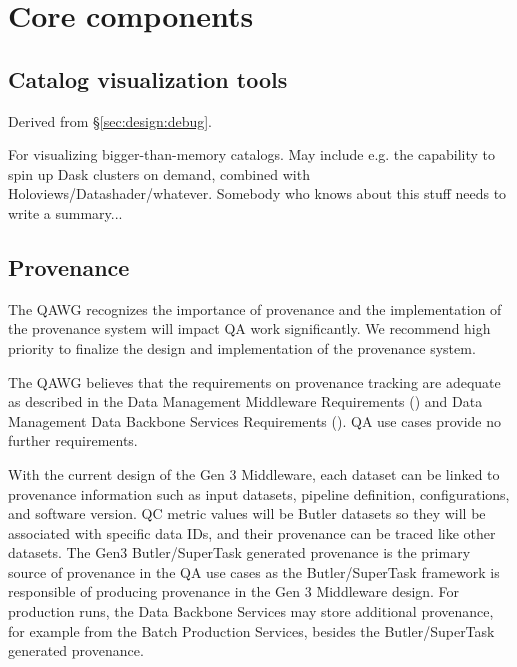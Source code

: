 \section{Core components}







\subsection{Catalog visualization tools}


Derived from \S\ref{sec:design:debug}.

For visualizing bigger-than-memory catalogs. May include e.g. the capability
to spin up Dask clusters on demand, combined with
Holoviews/Datashader/whatever. Somebody who knows about this stuff needs to
write a summary...

\subsection{Provenance}


The QAWG recognizes the importance of provenance and the
implementation of the provenance system will impact QA work
significantly.  We recommend high priority to finalize the design
and implementation of the provenance system.

The QAWG believes that the requirements on provenance tracking are
adequate as described in the Data Management Middleware Requirements
() and Data Management Data Backbone Services
Requirements (). QA use cases provide no further
requirements.

With the current design of the Gen 3 Middleware, each dataset
can be linked to provenance information such as input datasets,
pipeline definition, configurations, and software version.
QC metric values will be Butler datasets so they will be associated
with specific data IDs, and their provenance can be traced like
other datasets.  The Gen3 Butler/SuperTask generated provenance is
the primary source of provenance in the QA use cases as the
Butler/SuperTask framework is responsible of producing provenance
in the Gen 3 Middleware design.  For production runs, the Data
Backbone Services may store additional provenance, for example from
the Batch Production Services, besides the Butler/SuperTask generated
provenance.

